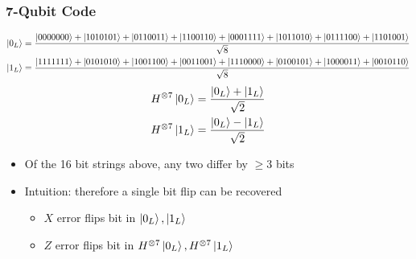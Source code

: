 \documentclass{beamer}
\begin{document}
\begin{frame}
  \frametitle{7-Qubit Code}
  \vspace{-1cm}
  {\tiny
    \begin{align*}
      \ket{0_L} &= \frac{\ket{0000000}+\ket{1010101}+\ket{0110011}+\ket{1100110}+\ket{0001111}+\ket{1011010}+\ket{0111100}+\ket{1101001}}{\sqrt{8}} \\
      \ket{1_L} &= \frac{\ket{1111111}+\ket{0101010}+\ket{1001100}+\ket{0011001}+\ket{1110000}+\ket{0100101}+\ket{1000011}+\ket{0010110}}{\sqrt{8}}
    \end{align*}
    \begin{align*}
      H^{\otimes 7}\ket{0_L} &= \frac{\ket{0_L}+\ket{1_L}}{\sqrt{2}} \\
      H^{\otimes 7}\ket{1_L} &= \frac{\ket{0_L}-\ket{1_L}}{\sqrt{2}}
    \end{align*}
  }
  \begin{itemize}
  \item Of the 16 bit strings above, any two differ by $\geq 3$ bits
  \item Intuition: therefore a single bit flip can be recovered
    \begin{itemize}
    \item $X$ error flips bit in $\ket{0_L},\ket{1_L}$
    \item $Z$ error flips bit in $H^{\otimes 7}\ket{0_L},H^{\otimes 7}\ket{1_L}$
    \end{itemize}
  \end{itemize}
\end{frame}


  
\end{document}
